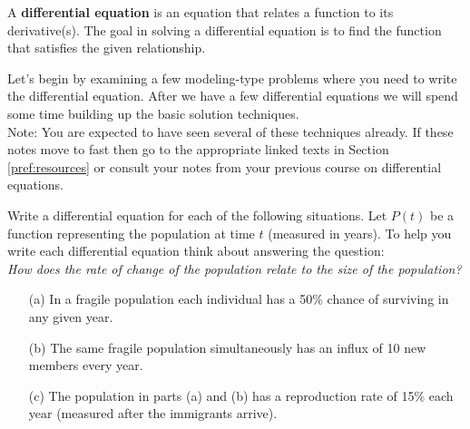 \begin{definition}
    A {\bf differential equation} is an equation that relates a function to its
    derivative(s).  The goal in solving a differential equation is to find the function
    that satisfies the given relationship.
\end{definition}

Let's begin by examining a few modeling-type problems where you need to write the
differential equation.  After we have a few differential equations we will spend some time
building up the basic solution techniques. \\
Note: You are expected to have seen several of these techniques already.  If these notes
move to fast then go to the appropriate linked texts in Section \ref{pref:resources} or
consult your notes from your previous course on differential equations.

\begin{problem}%
    Write a differential equation for each of the following situations.  Let $P(t)$ be a
    function representing the population at time $t$ (measured in years).  To help you write each differential equation think
    about answering the question: \\
    {\it How does the rate of change of the population relate to the size of the population?}
    \begin{enumerate}
        \item[(a)] In a fragile population each individual has a 50\% chance of surviving in any given year.  
        \item[(b)] The same fragile population simultaneously has an influx of 10 new
            members every year.
        \item[(c)] The population in parts (a) and (b) has a reproduction rate of 15\%
            each year (measured after the immigrants arrive).
    \end{enumerate}
\end{problem}

